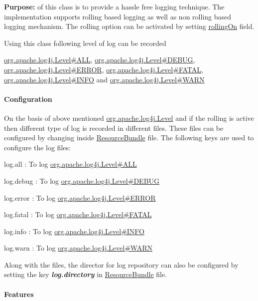 {\bfseries Purpose\+:} of this class is to provide a hassle free logging technique. The implementation supports rolling based logging as well as non rolling based logging mechanism. The rolling option can be activated by setting \mbox{\hyperlink{}{rolling\+On}} field.

Using this class following level of log can be recorded 
\begin{DoxyPre}
 \mbox{\hyperlink{}{org.apache.log4j.Level#ALL}}, \mbox{\hyperlink{}{org.apache.log4j.Level#DEBUG}},
 \mbox{\hyperlink{}{org.apache.log4j.Level#ERROR}}, \mbox{\hyperlink{}{org.apache.log4j.Level#FATAL}},
 \mbox{\hyperlink{}{org.apache.log4j.Level#INFO}} and \mbox{\hyperlink{}{org.apache.log4j.Level#WARN}}
 \end{DoxyPre}


\paragraph*{Configuration}

On the basis of above mentioned \mbox{\hyperlink{}{org.\+apache.\+log4j.\+Level}} and if the rolling is active then different type of log is recorded in different files. These files can be configured by changing inside \mbox{\hyperlink{}{Resource\+Bundle}} file. The following keys are used to configure the log files\+: 
\begin{DoxyItemize}
\item log.\+all \+: To log \mbox{\hyperlink{}{org.\+apache.\+log4j.\+Level\#\+A\+LL}} 
\item log.\+debug \+: To log \mbox{\hyperlink{}{org.\+apache.\+log4j.\+Level\#\+D\+E\+B\+UG}} 
\item log.\+error \+: To log \mbox{\hyperlink{}{org.\+apache.\+log4j.\+Level\#\+E\+R\+R\+OR}} 
\item log.\+fatal \+: To log \mbox{\hyperlink{}{org.\+apache.\+log4j.\+Level\#\+F\+A\+T\+AL}} 
\item log.\+info \+: To log \mbox{\hyperlink{}{org.\+apache.\+log4j.\+Level\#\+I\+N\+FO}} 
\item log.\+warn \+: To log \mbox{\hyperlink{}{org.\+apache.\+log4j.\+Level\#\+W\+A\+RN}} 
\end{DoxyItemize}Along with the files, the director for log repository can also be configured by setting the key {\bfseries {\itshape log.\+directory}} in \mbox{\hyperlink{}{Resource\+Bundle}} file. \paragraph*{Features}

